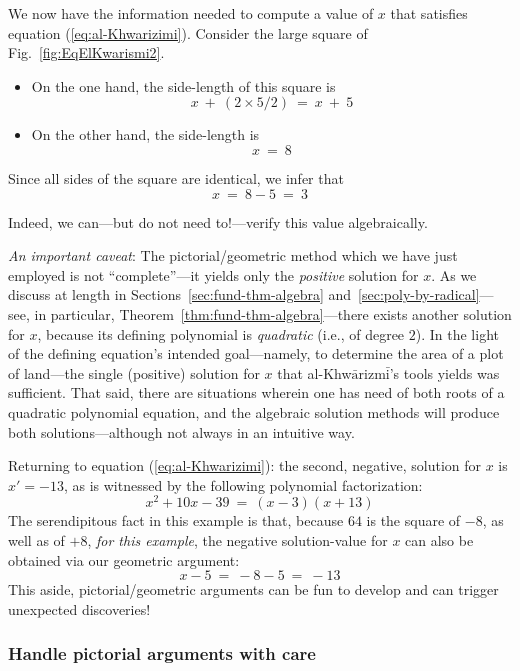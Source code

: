 \smallskip

We now have the information needed to compute a value of $x$ that satisfies equation (\ref{eq:al-Khwarizimi}).  Consider the large square of Fig.~\ref{fig:EqElKwarismi2}.

\begin{itemize}
\item
On the one hand, the side-length of this square is
\[ x \ + \ (2 \times 5/2) \ = \ x \ + \ 5 \]

\medskip\item
On the other hand, the side-length is
\[ x \ = \ 8 \]
\end{itemize}
Since all sides of the square are identical, we infer that
\[ x \ = \ 8-5 \ = \ 3 \]

\noindent
Indeed, we can---but do not need to!---verify this value algebraically.

\medskip

\noindent
{\em An important caveat}: The pictorial/geometric method which we have just employed is not ``complete''---it yields only the {\em positive} solution for $x$.  As we discuss at length in Sections~\ref{sec:fund-thm-algebra} and~\ref{sec:poly-by-radical}---see, in particular, Theorem~\ref{thm:fund-thm-algebra}---there exists another solution for $x$, because its defining polynomial is {\em quadratic} (i.e., of degree $2$).  In the light of the defining equation's intended goal---namely, to determine the area of a plot of land---the single (positive) solution for $x$ that al-Khw$\bar{\mbox{a}}$rizm$\bar{\mbox{i}}$'s tools yields was sufficient.  That said, there are situations wherein one has need of both roots of a quadratic polynomial equation, and the algebraic solution methods will produce both solutions---although not always in an intuitive way.

\medskip

Returning to equation (\ref{eq:al-Khwarizimi}):  the second, negative, solution for $x$  is $x' = -13$, as is witnessed by the following polynomial factorization:
\[ x^2 + 10x - 39 \ = \ (x-3)(x+13) \]
The serendipitous fact in this example is that, because $64$ is the square of $-8$, as well as of $+8$, {\em for this example}, the negative solution-value for $x$ can also be obtained via our geometric argument:
\[ x - 5 \ = \ -8 -5 \ = \ -13 \]
This aside, pictorial/geometric arguments can be fun to develop and can trigger unexpected discoveries!


\subsubsection{Handle pictorial arguments with care}

